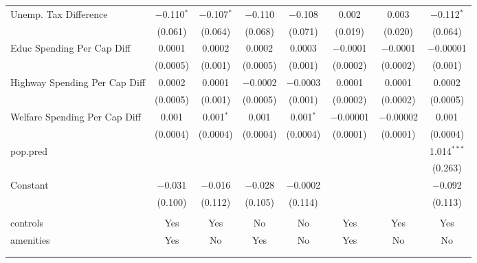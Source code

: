 \begin{table}[!htbp]
\begin{tabular}{@{\extracolsep{5pt}}lccccccc}
  Unemp. Tax Difference & $-$0.110$^{*}$ & $-$0.107$^{*}$ & $-$0.110 & $-$0.108 & 0.002 & 0.003 & $-$0.112$^{*}$ \\ 
  & (0.061) & (0.064) & (0.068) & (0.071) & (0.019) & (0.020) & (0.064) \\ 
  Educ Spending Per Cap Diff & 0.0001 & 0.0002 & 0.0002 & 0.0003 & $-$0.0001 & $-$0.0001 & $-$0.00001 \\ 
  & (0.0005) & (0.001) & (0.0005) & (0.001) & (0.0002) & (0.0002) & (0.001) \\ 
  Highway Spending Per Cap Diff & 0.0002 & 0.0001 & $-$0.0002 & $-$0.0003 & 0.0001 & 0.0001 & 0.0002 \\ 
  & (0.0005) & (0.001) & (0.0005) & (0.001) & (0.0002) & (0.0002) & (0.0005) \\ 
  Welfare Spending Per Cap Diff & 0.001 & 0.001$^{*}$ & 0.001 & 0.001$^{*}$ & $-$0.00001 & $-$0.00002 & 0.001 \\ 
  & (0.0004) & (0.0004) & (0.0004) & (0.0004) & (0.0001) & (0.0001) & (0.0004) \\ 
  pop.pred &  &  &  &  &  &  & 1.014$^{***}$ \\ 
  &  &  &  &  &  &  & (0.263) \\ 
  Constant & $-$0.031 & $-$0.016 & $-$0.028 & $-$0.0002 &  &  & $-$0.092 \\ 
  & (0.100) & (0.112) & (0.105) & (0.114) &  &  & (0.113) \\ 
 \hline \\[-1.8ex] 
controls & Yes & Yes & No & No & Yes & Yes & Yes \\ 
amenities & Yes & No & Yes & No & Yes & No & No \\ 
\hline \\[-1.8ex] 
\hline 
\hline \\[-1.8ex] 
\end{tabular} 
\end{table} 
